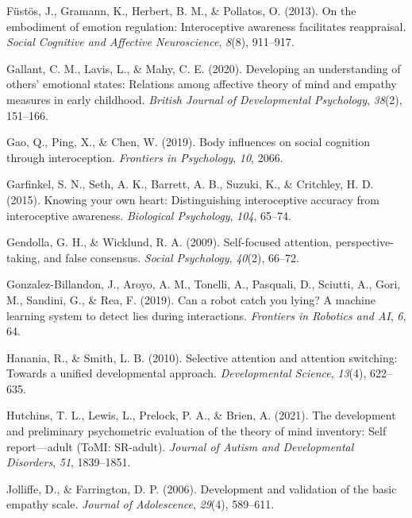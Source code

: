\documentclass[
  man,mask,floatsintext]{apa6}
\newlength{\cslhangindent}
\newenvironment{CSLReferences}[2] %
 {\begin{list}{}{%
  \setlength{\itemindent}{0pt}
  \setlength{\leftmargin}{0pt}
  \setlength{\parsep}{0pt}
  \ifodd #1
   \setlength{\leftmargin}{\cslhangindent}
   \setlength{\itemindent}{-1\cslhangindent}
  \fi
  \setlength{\itemsep}{#2\baselineskip}}}
 {\end{list}}
\begin{document}
\begin{CSLReferences}{1}{0}
Füstös, J., Gramann, K., Herbert, B. M., \& Pollatos, O. (2013). On the embodiment of emotion regulation: Interoceptive awareness facilitates reappraisal. \emph{Social Cognitive and Affective Neuroscience}, \emph{8}(8), 911--917.

Gallant, C. M., Lavis, L., \& Mahy, C. E. (2020). Developing an understanding of others' emotional states: Relations among affective theory of mind and empathy measures in early childhood. \emph{British Journal of Developmental Psychology}, \emph{38}(2), 151--166.

Gao, Q., Ping, X., \& Chen, W. (2019). Body influences on social cognition through interoception. \emph{Frontiers in Psychology}, \emph{10}, 2066.

Garfinkel, S. N., Seth, A. K., Barrett, A. B., Suzuki, K., \& Critchley, H. D. (2015). Knowing your own heart: Distinguishing interoceptive accuracy from interoceptive awareness. \emph{Biological Psychology}, \emph{104}, 65--74.

Gendolla, G. H., \& Wicklund, R. A. (2009). Self-focused attention, perspective-taking, and false consensus. \emph{Social Psychology}, \emph{40}(2), 66--72.

Gonzalez-Billandon, J., Aroyo, A. M., Tonelli, A., Pasquali, D., Sciutti, A., Gori, M., Sandini, G., \& Rea, F. (2019). Can a robot catch you lying? A machine learning system to detect lies during interactions. \emph{Frontiers in Robotics and AI}, \emph{6}, 64.

Hanania, R., \& Smith, L. B. (2010). Selective attention and attention switching: Towards a unified developmental approach. \emph{Developmental Science}, \emph{13}(4), 622--635.

Hutchins, T. L., Lewis, L., Prelock, P. A., \& Brien, A. (2021). The development and preliminary psychometric evaluation of the theory of mind inventory: Self report---adult (ToMI: SR-adult). \emph{Journal of Autism and Developmental Disorders}, \emph{51}, 1839--1851.

Jolliffe, D., \& Farrington, D. P. (2006). Development and validation of the basic empathy scale. \emph{Journal of Adolescence}, \emph{29}(4), 589--611.


\end{CSLReferences}
\end{document}
